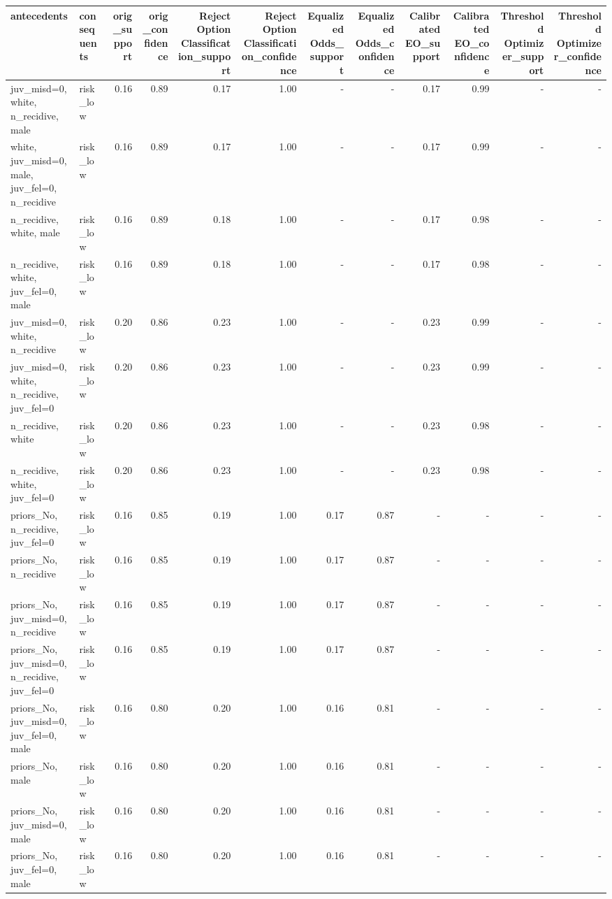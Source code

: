 \begin{tabular}{llrrrrrrrrrr}
\toprule
antecedents & consequents & orig\_support & orig\_confidence & Reject Option Classification\_support & Reject Option Classification\_confidence & Equalized Odds\_support & Equalized Odds\_confidence & Calibrated EO\_support & Calibrated EO\_confidence & Threshold Optimizer\_support & Threshold Optimizer\_confidence \\
\midrule
juv\_misd=0, white, n\_recidive, male & risk\_low & 0.16 & 0.89 & 0.17 & 1.00 & - & - & 0.17 & 0.99 & - & - \\
white, juv\_misd=0, male, juv\_fel=0, n\_recidive & risk\_low & 0.16 & 0.89 & 0.17 & 1.00 & - & - & 0.17 & 0.99 & - & - \\
n\_recidive, white, male & risk\_low & 0.16 & 0.89 & 0.18 & 1.00 & - & - & 0.17 & 0.98 & - & - \\
n\_recidive, white, juv\_fel=0, male & risk\_low & 0.16 & 0.89 & 0.18 & 1.00 & - & - & 0.17 & 0.98 & - & - \\
juv\_misd=0, white, n\_recidive & risk\_low & 0.20 & 0.86 & 0.23 & 1.00 & - & - & 0.23 & 0.99 & - & - \\
juv\_misd=0, white, n\_recidive, juv\_fel=0 & risk\_low & 0.20 & 0.86 & 0.23 & 1.00 & - & - & 0.23 & 0.99 & - & - \\
n\_recidive, white & risk\_low & 0.20 & 0.86 & 0.23 & 1.00 & - & - & 0.23 & 0.98 & - & - \\
n\_recidive, white, juv\_fel=0 & risk\_low & 0.20 & 0.86 & 0.23 & 1.00 & - & - & 0.23 & 0.98 & - & - \\
priors\_No, n\_recidive, juv\_fel=0 & risk\_low & 0.16 & 0.85 & 0.19 & 1.00 & 0.17 & 0.87 & - & - & - & - \\
priors\_No, n\_recidive & risk\_low & 0.16 & 0.85 & 0.19 & 1.00 & 0.17 & 0.87 & - & - & - & - \\
priors\_No, juv\_misd=0, n\_recidive & risk\_low & 0.16 & 0.85 & 0.19 & 1.00 & 0.17 & 0.87 & - & - & - & - \\
priors\_No, juv\_misd=0, n\_recidive, juv\_fel=0 & risk\_low & 0.16 & 0.85 & 0.19 & 1.00 & 0.17 & 0.87 & - & - & - & - \\
priors\_No, juv\_misd=0, juv\_fel=0, male & risk\_low & 0.16 & 0.80 & 0.20 & 1.00 & 0.16 & 0.81 & - & - & - & - \\
priors\_No, male & risk\_low & 0.16 & 0.80 & 0.20 & 1.00 & 0.16 & 0.81 & - & - & - & - \\
priors\_No, juv\_misd=0, male & risk\_low & 0.16 & 0.80 & 0.20 & 1.00 & 0.16 & 0.81 & - & - & - & - \\
priors\_No, juv\_fel=0, male & risk\_low & 0.16 & 0.80 & 0.20 & 1.00 & 0.16 & 0.81 & - & - & - & - \\
\bottomrule
\end{tabular}
